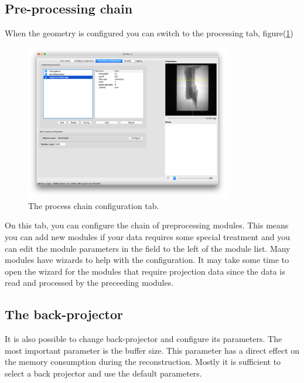 \documentclass[a4paper]{scrreprt}
\begin{document}
\subsection{Pre-processing chain}
When the geometry is configured you can switch to the processing tab,
figure(\ref{fig_processtab})
\begin{figure}
 \centering
\includegraphics[width=0.8\textwidth]{figures3/Main_Modules.png}
\caption{The process chain configuration tab.}\label{fig_processtab}
\end{figure}
On this tab, you can configure the chain of preprocessing modules. This means you can add new modules if your data requires some special treatment and you can edit the module parameters in the field to the left of the module list. Many modules have wizards to help with the configuration. It may take some time to open the wizard for the modules that require projection data since the data is read and processed by the preceeding modules.

\subsection{The back-projector}
It is also possible to change back-projector and configure its parameters. The most important parameter is the buffer size. This parameter has a direct effect on the memory consumption during the reconstruction. Mostly it is sufficient to select a back projector and use the default parameters.
\end{document}

